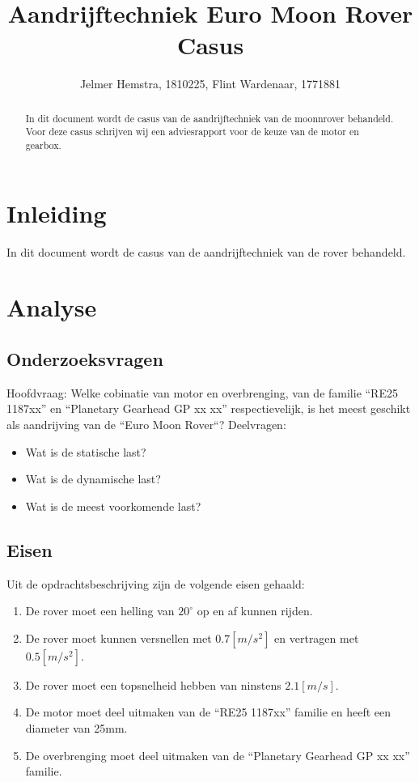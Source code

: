 \documentclass{article}
\title{Aandrijftechniek Euro Moon Rover Casus}
\author{Jelmer Hemstra, 1810225, Flint Wardenaar, 1771881}
\begin{document}
\maketitle
\newpage
\tableofcontents
\newpage
\begin{abstract}
    In dit document wordt de casus van de aandrijftechniek van de moonnrover behandeld. 
    Voor deze casus schrijven wij een adviesrapport voor de keuze van de motor en gearbox.

\end{abstract}


\section{Inleiding}
    In dit document wordt de casus van de aandrijftechniek van de rover behandeld. 


    \section{Analyse}
        \subsection{Onderzoeksvragen}
            Hoofdvraag: \newline
            Welke cobinatie van motor en overbrenging, 
            van de familie ``RE25 1187xx'' en ``Planetary Gearhead GP xx xx'' respectievelijk, 
            is het meest geschikt als aandrijving van de ``Euro Moon Rover``?
            \newline \newline
            Deelvragen: 
            \begin{itemize}
                \item Wat is de statische last?
                \item Wat is de dynamische last?
                \item Wat is de meest voorkomende last?
            \end{itemize}

        \subsection{Eisen}
            Uit de opdrachtsbeschrijving zijn de volgende eisen gehaald:
            \begin{enumerate}
                \item De rover moet een helling van $20^{\circ}$ op en af kunnen rijden.
                \item De rover moet kunnen versnellen met $0.7[m/s^2]$ en vertragen met $0.5[m/s^2]$.
                \item De rover moet een topsnelheid hebben van ninstens $2.1[m/s]$.
                \item De motor moet deel uitmaken van de ``RE25 1187xx'' familie en heeft een diameter van 25mm.
                \item De overbrenging moet deel uitmaken van de ``Planetary Gearhead GP xx xx'' familie.
            \end{enumerate}
        
\end{document}
